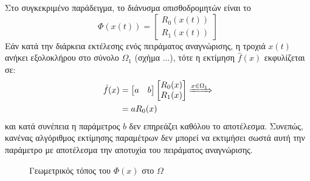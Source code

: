 Στο συγκεκριμένο παράδειγμα, το διάνυσμα οπισθοδρομητών είναι το
\begin{equation*}
	\varPhi(x(t)) = \begin{bmatrix}
	R_0(x(t)) \\ R_1(x(t)) 
	\end{bmatrix}
\end{equation*}
Εάν κατά την διάρκεια εκτέλεσης ενός πειράματος αναγνώρισης, η τροχιά $x(t)$ ανήκει εξολοκλήρου στο σύνολο $\Omega_1$ (σχήμα ...), τότε η εκτίμηση $\hat{f}(x)$ εκφυλίζεται σε:
\begin{equation*}
\begin{split}
\hat{f}(x) &=\begin{bmatrix} a & b \end{bmatrix} 
\begin{bmatrix} R_0(x) \\ R_1(x) \end{bmatrix} \xRightarrow{x \in \Omega_1}\\
&= a R_0(x)
\end{split}
\end{equation*}
και κατά συνέπεια η παράμετρος $b$ δεν επηρεάζει καθόλου το αποτέλεσμα. Συνεπώς, κανένας αλγόριθμος εκτίμησης παραμέτρων δεν μπορεί να εκτιμήσει σωστά αυτή την παράμετρο με αποτέλεσμα την αποτυχία του πειράματος αναγνώρισης.


\begin{figure}
	\centering
	\scalebox{1}{}
	\caption{ Γεωμετρικός τόπος του $\varPhi(x)$ στο $\Omega$}
	\label{fig:regressor_locus}
\end{figure}

